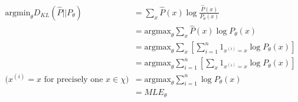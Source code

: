 %
%
\begin{answer}
\begin{align*}
\text{argmin}_\theta D_{KL} (\hat{P} || P_\theta)
&= \sum_x \hat{P}(x) \log \frac{\hat{P}(x)}{P_\theta(x)}\\
&= \text{argmax}_\theta \sum_x \hat{P}(x) \log P_\theta(x)\\
&= \text{argmax}_\theta \sum_x \left[ \sum_{i=1}^n 1_{x^{(i)} = x} \log P_\theta(x) \right]\\
&= \text{argmax}_\theta \sum_{i=1}^n \left[ \sum_x 1_{x^{(i)} = x} \log P_\theta(x) \right]\\
\text{($x^{(i)} = x$ for precisely one $x \in \chi$)} \quad
&= \text{argmax}_\theta \sum_{i=1}^n  \log P_\theta(x)\\
&= MLE_\theta
\end{align*}
\end{answer}
%
